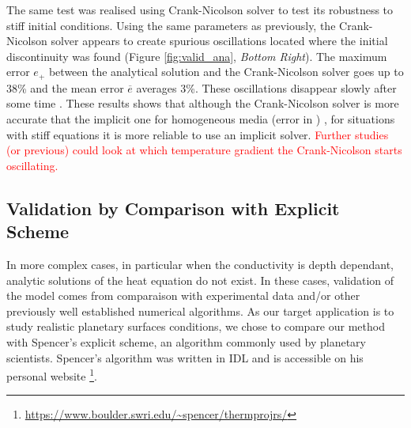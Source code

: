 \documentclass[]{interact}
\theoremstyle{plain}%
\theoremstyle{definition}
\theoremstyle{remark}
\begin{document}
The same test was realised using  Crank-Nicolson solver \cite{Schorghofer2010} to test its robustness to stiff initial conditions. 
Using the same parameters as previously, the Crank-Nicolson solver appears to create spurious oscillations located where the initial discontinuity was found (Figure \ref{fig:valid_ana}, \textit{Bottom Right}). 
The maximum error $e_+$ between the analytical solution and the Crank-Nicolson solver goes up to 38\% and the mean error $\overline{e}$ averages 3\%. 
These oscillations disappear slowly after some time \cite{citer}.   These results shows that although the Crank-Nicolson solver is more accurate that the implicit one for homogeneous media (error in ) \cite{citer}, for situations with stiff equations \cite{citer} it is more reliable to use an implicit solver.
\textcolor{red}{Further studies (or previous) could look at which temperature gradient the Crank-Nicolson starts oscillating.}


\subsection{Validation by Comparison with Explicit Scheme}

In more complex cases, in particular when the conductivity is depth dependant, analytic solutions of the heat equation do not exist. 
In these cases, validation of the model comes from comparaison with experimental data and/or  other previously well established numerical algorithms.
As our target application is to study realistic planetary surfaces conditions, we chose to compare our method with Spencer's \cite{Spencer1989} explicit scheme, an algorithm commonly used by planetary scientists.
Spencer's algorithm was written in IDL and is accessible on his personal website \footnote{\url{https://www.boulder.swri.edu/~spencer/thermprojrs/}}.
\end{document}
